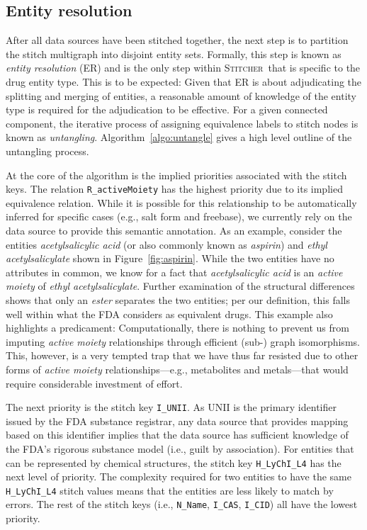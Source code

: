 \documentclass{bmcart}
\newcommand\st{\textsc{Stitcher}}
\begin{document}
\subsection*{Entity resolution}\label{sec:methods-er}
After all data sources have been stitched together, the next step is
to partition the stitch multigraph into disjoint entity sets.
Formally, this step is known as \emph{entity resolution} (ER) and is
the only step within \st\ that is specific to the drug entity type.
This is to be expected: Given that ER is about adjudicating
the splitting and merging of entities, a reasonable amount of
knowledge of the entity type is required for the adjudication to be
effective. For a given connected component, the iterative process of
assigning equivalence labels to stitch nodes is known
as \emph{untangling}. Algorithm~\ref{algo:untangle} gives a high level
outline of the untangling process.

At the core of the algorithm is the implied priorities associated with
the stitch keys. The relation \texttt{R\_activeMoiety} has the highest
priority due to its implied equivalence relation. While it is possible
for this relationship to be automatically inferred for specific cases
(e.g., salt form and freebase), we currently rely on the data source
to provide this semantic annotation. As an example, consider the
entities \emph{acetylsalicylic acid} (or also commonly known as
\emph{aspirin}) and \emph{ethyl acetylsalicylate} shown in
Figure~\ref{fig:aspirin}. While the two entities have no attributes in
common, we know for a fact that \emph{acetylsalicylic
  acid} is an \emph{active moiety} of \emph{ethyl
  acetylsalicylate}. Further examination of the structural differences
shows that only an \emph{ester} separates the two entities; per our
definition, this falls well within what the FDA considers as
equivalent drugs. This example also highlights a predicament:
Computationally, there is nothing to prevent us from imputing
\emph{active moiety} relationships through efficient (sub-) graph
isomorphisms. This, however, is a very tempted trap that we have thus
far resisted due to other forms of \emph{active moiety}
relationships---e.g., metabolites and metals---that would require
considerable investment of effort.

The next priority is the stitch key \texttt{I\_UNII}. As UNII is
the primary identifier issued by the FDA substance registrar, any data
source that provides mapping based on this identifier implies that the
data source has sufficient knowledge of the FDA's rigorous substance
model (i.e., guilt by association). For entities that can be
represented by chemical structures, the stitch 
key \texttt{H\_LyChI\_L4} has the next level of priority. The
complexity required for two entities to have the same
\texttt{H\_LyChI\_L4} stitch values means that the entities are
less likely to match by errors. The rest of the stitch keys
(i.e., \texttt{N\_Name}, \texttt{I\_CAS}, \texttt{I\_CID}) all have the
lowest priority.
\end{document}

